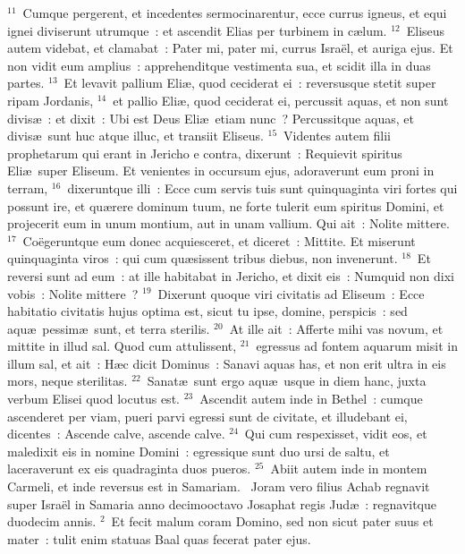 ${}^{11}$~Cumque pergerent, et incedentes sermocinarentur, ecce currus igneus, et equi ignei diviserunt utrumque~: et ascendit Elias per turbinem in c\ae lum.
${}^{12}$~Eliseus autem videbat, et clamabat~: Pater mi, pater mi, currus Isra\"el, et auriga ejus. Et non vidit eum amplius~: apprehenditque vestimenta sua, et scidit illa in duas partes.
${}^{13}$~Et levavit pallium Eli\ae , quod ceciderat ei~: reversusque stetit super ripam Jordanis,
${}^{14}$~et pallio Eli\ae , quod ceciderat ei, percussit aquas, et non sunt divis\ae~: et dixit~: Ubi est Deus Eli\ae\ etiam nunc~? Percussitque aquas, et divis\ae\ sunt huc atque illuc, et transiit Eliseus.
${}^{15}$~Videntes autem filii prophetarum qui erant in Jericho e contra, dixerunt~: Requievit spiritus Eli\ae\ super Eliseum. Et venientes in occursum ejus, adoraverunt eum proni in terram,
${}^{16}$~dixeruntque illi~: Ecce cum servis tuis sunt quinquaginta viri fortes qui possunt ire, et qu\ae rere dominum tuum, ne forte tulerit eum spiritus Domini, et projecerit eum in unum montium, aut in unam vallium. Qui ait~: Nolite mittere.
${}^{17}$~Co\"egeruntque eum donec acquiesceret, et diceret~: Mittite. Et miserunt quinquaginta viros~: qui cum qu\ae sissent tribus diebus, non invenerunt.
${}^{18}$~Et reversi sunt ad eum~: at ille habitabat in Jericho, et dixit eis~: Numquid non dixi vobis~: Nolite mittere~?
${}^{19}$~Dixerunt quoque viri civitatis ad Eliseum~: Ecce habitatio civitatis hujus optima est, sicut tu ipse, domine, perspicis~: sed aqu\ae\ pessim\ae\ sunt, et terra sterilis.
${}^{20}$~At ille ait~: Afferte mihi vas novum, et mittite in illud sal. Quod cum attulissent,
${}^{21}$~egressus ad fontem aquarum misit in illum sal, et ait~: H\ae c dicit Dominus~: Sanavi aquas has, et non erit ultra in eis mors, neque sterilitas.
${}^{22}$~Sanat\ae\ sunt ergo aqu\ae\ usque in diem hanc, juxta verbum Elisei quod locutus est.
${}^{23}$~Ascendit autem inde in Bethel~: cumque ascenderet per viam, pueri parvi egressi sunt de civitate, et illudebant ei, dicentes~: Ascende calve, ascende calve.
${}^{24}$~Qui cum respexisset, vidit eos, et maledixit eis in nomine Domini~: egressique sunt duo ursi de saltu, et laceraverunt ex eis quadraginta duos pueros.
${}^{25}$~Abiit autem inde in montem Carmeli, et inde reversus est in Samariam.
~\lettrine[lines=10,image=true,loversize=0.05,lraise=-0.03]{J}{}oram vero filius Achab regnavit super Isra\"el in Samaria anno decimooctavo Josaphat regis Jud\ae~: regnavitque duodecim annis.
${}^{2}$~Et fecit malum coram Domino, sed non sicut pater suus et mater~: tulit enim statuas Baal quas fecerat pater ejus.
